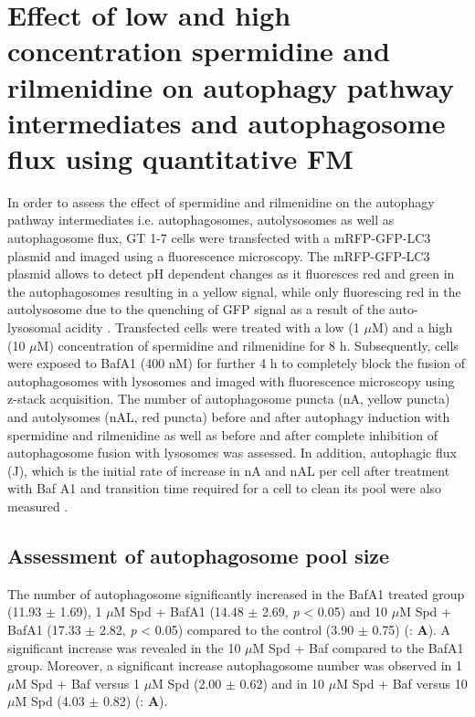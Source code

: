 {\section{Effect of low and high concentration spermidine and rilmenidine on autophagy pathway intermediates and autophagosome flux using quantitative FM}
In order to assess the effect of spermidine and rilmenidine on the autophagy pathway intermediates i.e. autophagosomes, autolysosomes as well as autophagosome flux, GT 1-7 cells were transfected with a mRFP-GFP-LC3 plasmid \citep{yoshii2017} and imaged using a fluorescence microscopy. The mRFP-GFP-LC3 plasmid allows to detect pH dependent changes as it fluoresces red and green in the autophagosomes resulting in a yellow signal, while only fluorescing red in the autolysosome due to the quenching of GFP signal as a result of the auto-lysosomal acidity \citep{yoshii2017}. Transfected cells were treated with a low (1 $\mu$M) and a high (10 $\mu$M) concentration of spermidine and rilmenidine for 8 h. Subsequently, cells were exposed to BafA1 (400 nM) for further 4 h to completely block the fusion of autophagosomes with lysosomes \citep{DuToit2018a} and imaged with fluorescence microscopy using z-stack acquisition. The number of autophagosome puncta (nA, yellow puncta) and autolysomes (nAL, red puncta) before and after autophagy induction with spermidine and rilmenidine as well as before and after complete inhibition of autophagosome fusion with lysosomes was assessed. In addition, autophagic flux (J), which is the initial rate of increase in nA and nAL per cell after treatment with Baf A1 and transition time required for a cell to clean its pool were also measured \citep{DuToit2018a,DuToit2018b,loos2014}.

\subsection{Assessment of autophagosome pool size}
The number of autophagosome significantly increased in the BafA1 treated group (11.93  $\pm$ 1.69), 1 $\mu$M Spd + BafA1 (14.48 $\pm$ 2.69, \textit{p} < 0.05) and 10 $\mu$M Spd + BafA1 (17.33 $\pm$ 2.82, \textit{p} < 0.05) compared to the control (3.90 $\pm$ 0.75) (: \textbf{A}). A significant increase was revealed in the 10 $\mu$M Spd + Baf compared to the BafA1 group. Moreover, a significant increase autophagosome number was observed in 1 $\mu$M Spd + Baf versus 1 $\mu$M Spd (2.00 $\pm$ 0.62) and in 10 $\mu$M Spd + Baf versus 10 $\mu$M Spd (4.03 $\pm$ 0.82) (: \textbf{A}).

}

